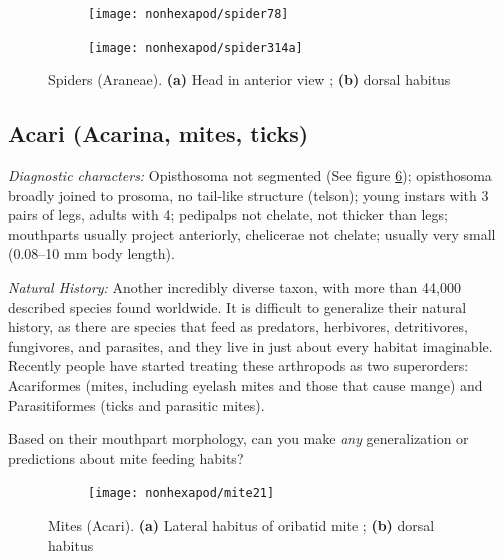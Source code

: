\begin{figure}[ht!]
    \centering
    \begin{subfigure}[ht!]{0.2\textwidth}
        \texttt{[image: nonhexapod/spider78]}
        \caption{}
        \label{fig:fang}
    \end{subfigure}
    \hfill
    \begin{subfigure}[ht!]{0.7\textwidth}
        \texttt{[image: nonhexapod/spider314a]}
        \caption{}
        \label{fig:spider}
    \end{subfigure}
    \caption{Spiders (Araneae). \textbf{(a)} Head in anterior view \citep[][Fig. 78]{bhlitem21199comstock}; \textbf{(b)} dorsal habitus \citep[][Fig. 314a]{bhlitem21199comstock}}\label{fig:spiders}
\end{figure}

\subsection{Acari (Acarina, mites, ticks)}
\noindent{}\textit{Diagnostic characters:} Opisthosoma not segmented (See figure \ref{fig:mites}); opisthosoma broadly joined to prosoma, no tail-like structure (telson); young instars with 3 pairs of legs, adults with 4; pedipalps not chelate, not thicker than legs; mouthparts usually project anteriorly, chelicerae not chelate; usually very small (0.08--10 mm body length).\vspace{3mm}

\noindent{}\textit{Natural History:} Another incredibly diverse taxon, with more than 44,000 described species found worldwide. It is difficult to generalize their natural history, as there are species that feed as predators, herbivores, detritivores, fungivores, and parasites, and they live in just about every habitat imaginable. Recently people have started treating these arthropods as two superorders: Acariformes (mites, including eyelash mites and those that cause mange) and Parasitiformes (ticks and parasitic mites).\vspace{3mm}

\begin{theo}
{}Based on their mouthpart morphology, can you make \textit{any} generalization or predictions about mite feeding habits?
\end{theo}

\begin{figure}[ht!]
    \centering
    \begin{subfigure}[ht!]{0.4\textwidth}
        \caption{}
        \label{fig:mite1}
    \end{subfigure}
    \hfill
    \begin{subfigure}[ht!]{0.45\textwidth}
        \texttt{[image: nonhexapod/mite21]}
        \caption{}
        \label{fig:mite2}
    \end{subfigure}
    \caption{Mites (Acari). \textbf{(a)} Lateral habitus of oribatid mite \citep[][Fig. 187]{bhlitem132773acari}; \textbf{(b)} dorsal habitus \citep[][Fig. 21]{bhlitem132773acari}} \label{fig:mites}
\end{figure}

